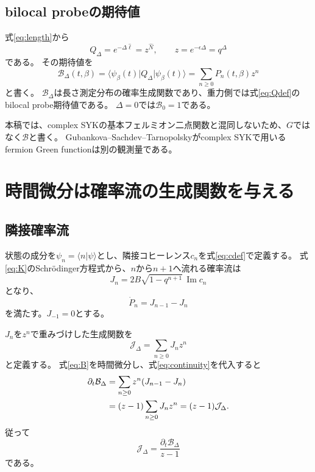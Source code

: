 \documentclass[a4paper,11pt]{ltjsarticle}
\numberwithin{equation}{section}
\newcommand{\ket}[1]{\lvert #1\rangle}
\newcommand{\bra}[1]{\langle #1\rvert}
\begin{document}
\subsection{bilocal probeの期待値}
式\eqref{eq:length}から
\begin{equation}
 Q_\Delta=e^{-\Delta\hat\ell}=z^{\hat N},
 \qquad
 z=e^{-\epsilon\Delta}=q^\Delta
 \label{eq:z}
\end{equation}
である。
その期待値を
\begin{equation}
 \mathcal B_\Delta(t,\beta)
 =\bra{\psi_\beta(t)}Q_\Delta\ket{\psi_\beta(t)}
 =\sum_{n\geq0}P_n(t,\beta)z^n
 \label{eq:B}
\end{equation}
と書く。
$\mathcal B_\Delta$は長さ測定分布の確率生成関数であり、重力側では式\eqref{eq:Qdef}のbilocal probe期待値である\cite{Heller}。
$\Delta=0$では$\mathcal B_0=1$である。

本稿では、complex SYKの基本フェルミオン二点関数と混同しないため、$G$ではなく$\mathcal B$と書く。
Gubankova--Sachdev--Tarnopolskyがcomplex SYKで用いるfermion Green functionは別の観測量である\cite{GST}。

\section{時間微分は確率流の生成関数を与える}
\subsection{隣接確率流}
状態の成分を$\psi_n=\langle n|\psi\rangle$とし、隣接コヒーレンス$c_n$を式\eqref{eq:cdef}で定義する。
式\eqref{eq:K}のSchr\"odinger方程式から、$n$から$n+1$へ流れる確率流は
\begin{equation}
 J_n=2B\sqrt{1-q^{n+1}}\,\operatorname{Im}c_n
 \label{eq:J}
\end{equation}
となり、
\begin{equation}
 \dot P_n=J_{n-1}-J_n
 \label{eq:continuity}
\end{equation}
を満たす。$J_{-1}=0$とする。

$J_n$を$z^n$で重みづけした生成関数を
\begin{equation}
 \mathcal J_\Delta
 =\sum_{n\geq0}J_n z^n
 \label{eq:Jgen}
\end{equation}
と定義する。
式\eqref{eq:B}を時間微分し、式\eqref{eq:continuity}を代入すると
\begin{align}
 \partial_t\mathcal B_\Delta
 &=\sum_{n\geq0}z^n(J_{n-1}-J_n)\notag\\
 &=(z-1)\sum_{n\geq0}J_nz^n
 =(z-1)\mathcal J_\Delta.
 \label{eq:timeidentity}
\end{align}
従って
\begin{equation}
 \boxed{\displaystyle
 \mathcal J_\Delta
 =\frac{\partial_t\mathcal B_\Delta}{z-1}}
 \label{eq:JfromB}
\end{equation}
である。
\end{document}
